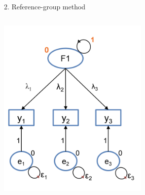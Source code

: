 \documentclass[10pt]{beamer}\usepackage[]{graphicx}\usepackage[]{xcolor}
\begin{document}
\begin{frame}{2. Reference-group method}
\begin{columns}[T]
    \hfill%
    \begin{column}{.34\textwidth}
        \includegraphics[width=\linewidth,height=\textheight,keepaspectratio]{images/slide60.png}
    \end{column}%
    \end{columns}
    
\end{frame}
%
\end{document}
